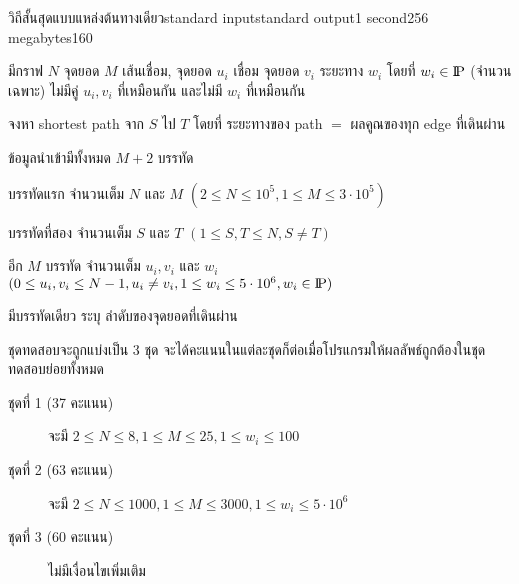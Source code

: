 \documentclass[11pt,a4paper]{article}
\begin{document}
\begin{problem}{วิถีสั้นสุดแบบแหล่งต้นทางเดียว}{standard input}{standard output}{1 second}{256 megabytes}{160}

มีกราฟ $N$ จุดยอด $M$ เส้นเชื่อม, จุดยอด $u_i$ เชื่อม จุดยอด $v_i$ ระยะทาง $w_i$ โดยที่ $w_i \in {\rm I\!P}$
(จำนวนเฉพาะ) ไม่มีคู่ $u_i, v_i$ ที่เหมือนกัน และไม่มี $w_i$ ที่เหมือนกัน

จงหา shortest path จาก $S$ ไป $T$ โดยที่ ระยะทางของ path $=$ ผลคูณของทุก edge ที่เดินผ่าน

\InputFile
ข้อมูลนำเข้ามีทั้งหมด $M+2$ บรรทัด

บรรทัดแรก จำนวนเต็ม $N$ และ $M$ $(2 \le N \le 10^5, 1 \le M \le 3\cdot10^5)$

บรรทัดที่สอง จำนวนเต็ม $S$ และ $T$ $(1 \le S, T \le N, S \neq T)$

อีก $M$ บรรทัด จำนวนเต็ม $u_i, v_i$ และ $w_i$ $(0 \le u_i, v_i \le N-1, u_i \neq v_i,
1 \le w_i \le 5\cdot10^6, w_i \in {\rm I\!P})$

\OutputFile
มีบรรทัดเดียว ระบุ ลำดับของจุดยอดที่เดินผ่าน

\Scoring
ชุดทดสอบจะถูกแบ่งเป็น 3 ชุด จะได้คะแนนในแต่ละชุดก็ต่อเมื่อโปรแกรมให้ผลลัพธ์ถูกต้องในชุดทดสอบย่อยทั้งหมด

\begin{description}
\item[ชุดที่ 1 (37 คะแนน)] จะมี $2 \le N \le 8, 1 \le M \le 25, 1 \le w_i \le 100$

\item[ชุดที่ 2 (63 คะแนน)] จะมี $2 \le N \le 1000, 1 \le M \le 3000, 1 \le w_i \le 5\cdot10^6$

\item[ชุดที่ 3 (60 คะแนน)] ไม่มีเงื่อนไขเพิ่มเติม
\end{description}

\Examples

\begin{example}
%
\end{example}

\end{problem}
\end{document}
